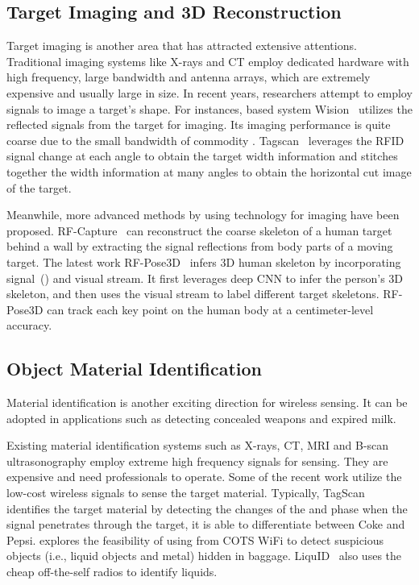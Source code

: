 \subsection{Target Imaging and 3D Reconstruction}

Target imaging is another area that has attracted extensive attentions. Traditional imaging systems like X-rays and CT employ dedicated
hardware with high frequency, large bandwidth and antenna arrays, which are extremely expensive and usually large in size. In recent years, researchers attempt to employ \RF signals to image a target's shape. For instances, \WiFi based system Wision~\cite{Huang2014Feasibility} utilizes the reflected signals from the target for imaging. Its imaging performance is quite coarse due to the small bandwidth of commodity \WiFi. Tagscan~\cite{Tagscan} leverages the RFID signal change at each angle to obtain the target width information and stitches together the width information at many angles to obtain the horizontal cut image of the target.

Meanwhile, more advanced methods by using \FMCW technology for imaging have been proposed. RF-Capture~\cite{Adib2017Capturing} can reconstruct the coarse skeleton of a human target behind a wall by extracting the signal reflections from body parts of a moving target. The latest work RF-Pose3D~\cite{zhao2018rf} infers 3D human skeleton by incorporating \RF signal~(\FMCW) and visual stream. It first leverages deep CNN to infer the person's 3D skeleton, and then uses the visual stream to label different target skeletons. RF-Pose3D can track each key point on the human body at a centimeter-level accuracy.


\subsection{Object Material Identification}
Material identification is another exciting direction for wireless sensing. It can be adopted in
applications such as detecting concealed weapons and expired milk. %

Existing material identification systems such as X-rays, CT, MRI and B-scan ultrasonography employ extreme high
frequency signals for sensing. They are expensive and need professionals to operate. Some of the recent work utilize the low-cost
wireless signals to sense the target material. Typically, TagScan~\cite{Tagscan} identifies the target material by detecting the changes of the
\RSSI and phase when the \RFID signal penetrates through the target, it is able to differentiate between Coke and Pepsi. \cite{In-baggage} explores the feasibility of using \CSI from COTS WiFi to detect suspicious objects (i.e., liquid objects and metal) hidden in baggage. LiquID~\cite{LiquID} also uses the cheap off-the-self \UWB radios to identify liquids.


